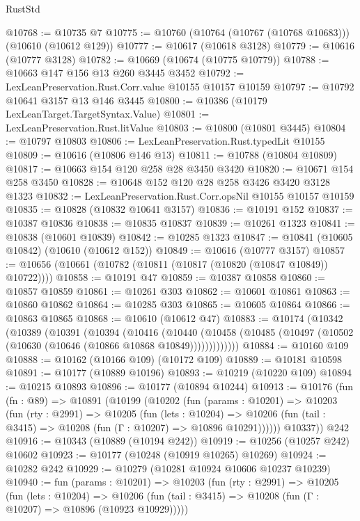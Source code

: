 \begin{lexlean}{RustStd}
\begin{coremodule}
@10768 := @10735 @7
@10775 := @10760 (@10764 (@10767 (@10768 @10683))) (@10610 (@10612 @129))
@10777 := @10617 (@10618 @3128)
@10779 := @10616 (@10777 @3128)
@10782 := @10669 (@10674 (@10775 @10779))
@10788 := @10663 @147 @156 @13 @260 @3445 @3452
@10792 := LexLeanPreservation.Rust.Corr.value @10155 @10157 @10159
@10797 := @10792 @10641 @3157 @13 @146 @3445
@10800 := @10386 (@10179 LexLeanTarget.TargetSyntax.Value)
@10801 := LexLeanPreservation.Rust.litValue
@10803 := @10800 (@10801 @3445)
@10804 := @10797 @10803
@10806 := LexLeanPreservation.Rust.typedLit @10155
@10809 := @10616 (@10806 @146 @13)
@10811 := @10788 (@10804 @10809)
@10817 := @10663 @154 @120 @258 @28 @3450 @3420
@10820 := @10671 @154 @258 @3450
@10828 := @10648 @152 @120 @28 @258 @3426 @3420 @3128 @1323
@10832 := LexLeanPreservation.Rust.Corr.opsNil @10155 @10157 @10159
@10835 := @10828 (@10832 @10641 @3157)
@10836 := @10191 @152
@10837 := @10387 @10836
@10838 := @10835 @10837
@10839 := @10261 @1323
@10841 := @10838 (@10601 @10839)
@10842 := @10285 @1323
@10847 := @10841 (@10605 @10842) (@10610 (@10612 @152))
@10849 := @10616 (@10777 @3157)
@10857 := @10656 (@10661 (@10782 (@10811 (@10817 (@10820 (@10847 @10849)) @10722))))
@10858 := @10191 @47
@10859 := @10387 @10858
@10860 := @10857 @10859
@10861 := @10261 @303
@10862 := @10601 @10861
@10863 := @10860 @10862
@10864 := @10285 @303
@10865 := @10605 @10864
@10866 := @10863 @10865
@10868 := @10610 (@10612 @47)
@10883 := @10174
    (@10342
      (@10389
        (@10391
          (@10394
            (@10416
              (@10440
                (@10458 (@10485 (@10497 (@10502 (@10630 (@10646 (@10866 @10868 @10849)))))))))))))
@10884 := @10160 @109
@10888 := @10162 (@10166 @109) (@10172 @109)
@10889 := @10181 @10598
@10891 := @10177 (@10889 @10196)
@10893 := @10219 (@10220 @109)
@10894 := @10215 @10893
@10896 := @10177 (@10894 @10244)
@10913 := @10176
    (fun (fn : @89) =>
    @10891
      (@10199
        (@10202
          (fun (params : @10201) =>
          @10203
            (fun (rty : @2991) =>
            @10205
              (fun (lets : @10204) =>
              @10206 (fun (tail : @3415) => @10208 (fun (Γ : @10207) => @10896 @10291))))))
        @10337))
    @242
@10916 := @10343 (@10889 (@10194 @242))
@10919 := @10256 (@10257 @242) @10602
@10923 := @10177 (@10248 (@10919 @10265) @10269)
@10924 := @10282 @242
@10929 := @10279 (@10281 @10924 @10606 @10237 @10239)
@10940 := fun (params : @10201) =>
  @10203
    (fun (rty : @2991) =>
    @10205
      (fun (lets : @10204) =>
      @10206 (fun (tail : @3415) => @10208 (fun (Γ : @10207) => @10896 (@10923 @10929)))))

\end{coremodule}
\end{lexlean}
